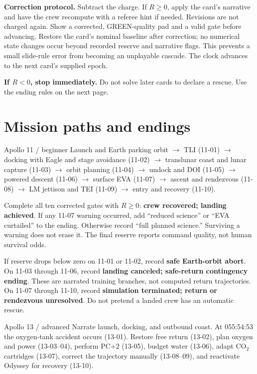 \documentclass[11pt]{article}
\begin{document}
\textbf{Correction protocol.} Subtract the charge. If \(R\geq0\),
apply the card's narrative and have the crew recompute with a referee
hint if needed. Revisions are not charged again. Show a corrected,
GREEN-quality pad and a valid gate before advancing.
Restore the card's nominal baseline after correction; no numerical
state changes occur beyond recorded reserve and narrative flags.
This prevents a small slide-rule error from becoming an unplayable
cascade. The clock advances to the next card's supplied epoch.

\textbf{If \(R<0\), stop immediately.} Do not solve later cards to
declare a rescue. Use the ending rules on the next page.

\clearpage
\section*{Mission paths and endings}
\begin{panel}{Apollo 11 / beginner}
Launch and Earth parking orbit \(\rightarrow\) TLI (11-01)
\(\rightarrow\) docking with Eagle and stage avoidance (11-02)
\(\rightarrow\) translunar coast and lunar capture (11-03)
\(\rightarrow\) orbit planning (11-04)
\(\rightarrow\) undock and DOI (11-05)
\(\rightarrow\) powered descent (11-06)
\(\rightarrow\) surface EVA (11-07)
\(\rightarrow\) ascent and rendezvous (11-08)
\(\rightarrow\) LM jettison and TEI (11-09)
\(\rightarrow\) entry and recovery (11-10).
\end{panel}

Complete all ten corrected gates with \(R\geq0\):
\textbf{crew recovered; landing achieved}. If any 11-07 warning occurred,
add ``reduced science'' or ``EVA curtailed'' to the ending.
Otherwise record ``full planned science.'' Surviving a warning does not
erase it. The final reserve reports command quality, not human survival odds.

If reserve drops below zero on 11-01 or 11-02, record
\textbf{safe Earth-orbit abort}. On 11-03 through 11-06,
record \textbf{landing canceled; safe-return contingency ending}.
These are narrated training branches, not computed return trajectories.
On 11-07 through 11-10, record
\textbf{simulation terminated; return or rendezvous unresolved}.
Do not pretend a landed crew has an automatic rescue.

\begin{panel}{Apollo 13 / advanced}
Narrate launch, docking, and outbound coast.
At 055:54:53 the oxygen-tank accident occurs (13-01).
Restore free return (13-02), plan oxygen and power (13-03--04),
perform PC+2 (13-05), budget water (13-06),
adapt CO\(_2\) cartridges (13-07), correct the trajectory manually
(13-08--09), and reactivate Odyssey for recovery (13-10).
\end{panel}
\end{document}
